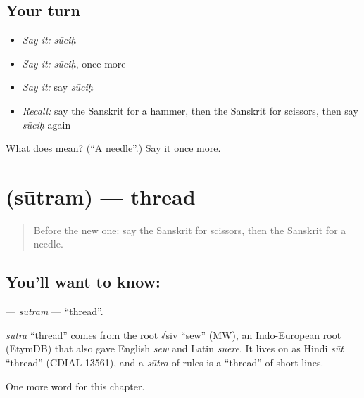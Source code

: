 \subsection*{Your turn}
\begin{itemize}
\raggedright
  \item \emph{Say it:} \emph{sūciḥ}
  \item \emph{Say it:} \emph{sūciḥ}, once more
  \item \emph{Say it:} say \emph{sūciḥ}
  \item \emph{Recall:} say the Sanskrit for a hammer, then the Sanskrit for scissors, then say \emph{sūciḥ} again
\end{itemize}

\begin{tcolorbox}[breakable,colback=teal!4,colframe=teal!35!black,title={Before you move on}]
What does  mean? (\textquotedblleft{}A needle\textquotedblright{}.) Say it once more.
\end{tcolorbox}
\section[\texorpdfstring{\sk{सूत्रम्} (sūtram)}{सूत्रम् (sūtram)}]{ (sūtram) — thread}

\label{lesson:SA-C100-sutram}



\begin{quote}
Before the new one: say the Sanskrit for scissors, then the Sanskrit for a needle.
\end{quote}

\subsection*{You'll want to know: }
\textbf{} — \emph{sūtram} — \textquotedblleft{}thread\textquotedblright{}.

\begin{cousinweb}
\emph{sūtra} \textquotedblleft{}thread\textquotedblright{} comes from the root √siv \textquotedblleft{}sew\textquotedblright{} (MW), an Indo-European root (EtymDB) that also gave English \emph{sew} and Latin \emph{suere}. It lives on as Hindi \emph{sūt} \textquotedblleft{}thread\textquotedblright{} (CDIAL 13561), and a \emph{sūtra} of rules is a \textquotedblleft{}thread\textquotedblright{} of short lines.
\end{cousinweb}

\begin{grammarlens}[title={What you've built}]
One more word for this chapter.
\end{grammarlens}

